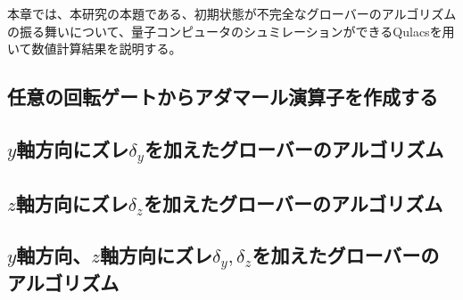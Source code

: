 \begin{comment}
    本論
\end{comment}
本章では、本研究の本題である、初期状態が不完全なグローバーのアルゴリズムの振る舞いについて、量子コンピュータのシュミレーションができるQulacs\cite{QulacsGitHub}を用いて数値計算結果を説明する。


\subsection{任意の回転ゲートからアダマール演算子を作成する}


\subsection{$y$軸方向にズレ$\delta_y$を加えたグローバーのアルゴリズム}

\subsection{$z$軸方向にズレ$\delta_z$を加えたグローバーのアルゴリズム}

\subsection{$y$軸方向、$z$軸方向にズレ$\delta_y, \delta_z$を加えたグローバーのアルゴリズム}
